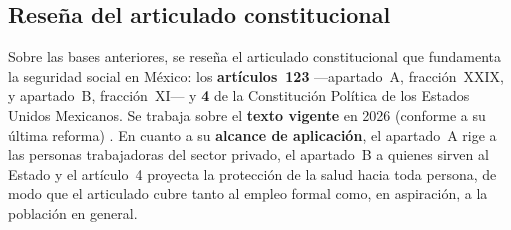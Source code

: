 \documentclass[12pt,letterpaper,oneside]{article}
\begin{document}
\subsection{Rese\~na del articulado constitucional}
Sobre las bases anteriores, se rese\~na el articulado constitucional que fundamenta la seguridad social en M\'exico: los \textbf{art\'iculos~123} —apartado~A, fracci\'on~XXIX, y apartado~B, fracci\'on~XI— y \textbf{4} de la Constituci\'on Pol\'itica de los Estados Unidos Mexicanos. Se trabaja sobre el \textbf{texto vigente} en 2026 (conforme a su \'ultima reforma) \citep{cpeum2026}. En cuanto a su \textbf{alcance de aplicaci\'on}, el apartado~A rige a las personas trabajadoras del sector privado, el apartado~B a quienes sirven al Estado y el art\'iculo~4 proyecta la protecci\'on de la salud hacia toda persona, de modo que el articulado cubre tanto al empleo formal como, en aspiraci\'on, a la poblaci\'on en general.
\end{document}
